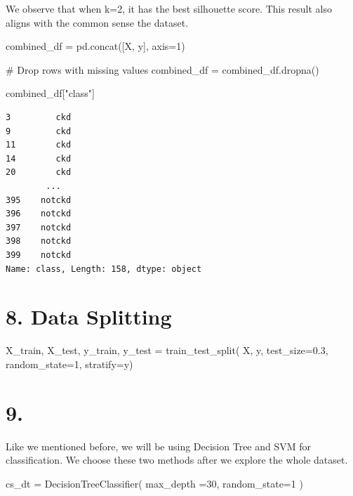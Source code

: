 \documentclass[
  11pt,
  letterpaper,
  DIV=11,
  numbers=noendperiod]{scrartcl}
\newenvironment{Shaded}{\begin{snugshade}}{\end{snugshade}}
\newcommand{\CommentTok}[1]{\textcolor[rgb]{0.37,0.37,0.37}{#1}}
\newcommand{\DecValTok}[1]{\textcolor[rgb]{0.68,0.00,0.00}{#1}}
\newcommand{\FloatTok}[1]{\textcolor[rgb]{0.68,0.00,0.00}{#1}}
\newcommand{\NormalTok}[1]{\textcolor[rgb]{0.00,0.23,0.31}{#1}}
\newcommand{\OperatorTok}[1]{\textcolor[rgb]{0.37,0.37,0.37}{#1}}
\newcommand{\StringTok}[1]{\textcolor[rgb]{0.13,0.47,0.30}{#1}}
\begin{document}
We observe that when k=2, it has the best silhouette score. This result
also aligns with the common sense the dataset.

\begin{Shaded}
\begin{Highlighting}[]
\NormalTok{combined\_df }\OperatorTok{=}\NormalTok{ pd.concat([X, y], axis}\OperatorTok{=}\DecValTok{1}\NormalTok{)}

\CommentTok{\# Drop rows with missing values}
\NormalTok{combined\_df }\OperatorTok{=}\NormalTok{ combined\_df.dropna()}


\NormalTok{combined\_df[}\StringTok{"class"}\NormalTok{]}

\end{Highlighting}
\end{Shaded}

\begin{verbatim}
3         ckd
9         ckd
11        ckd
14        ckd
20        ckd
        ...  
395    notckd
396    notckd
397    notckd
398    notckd
399    notckd
Name: class, Length: 158, dtype: object
\end{verbatim}

\section{8. Data Splitting}\label{data-splitting}

\begin{Shaded}
\begin{Highlighting}[]
\NormalTok{X\_train, X\_test, y\_train, y\_test }\OperatorTok{=}\NormalTok{ train\_test\_split(}
\NormalTok{    X, y, test\_size}\OperatorTok{=}\FloatTok{0.3}\NormalTok{, random\_state}\OperatorTok{=}\DecValTok{1}\NormalTok{, stratify}\OperatorTok{=}\NormalTok{y)}
\end{Highlighting}
\end{Shaded}

\section{9.}\label{section-4}

Like we mentioned before, we will be using Decision Tree and SVM for
classification. We choose these two methods after we explore the whole
dataset.

\begin{Shaded}
\begin{Highlighting}[]
\NormalTok{cs\_dt }\OperatorTok{=}\NormalTok{ DecisionTreeClassifier(}
\NormalTok{    max\_depth }\OperatorTok{=}\DecValTok{30}\NormalTok{, }
\NormalTok{    random\_state}\OperatorTok{=}\DecValTok{1}
\NormalTok{) }
\end{Highlighting}
\end{Shaded}
\end{document}
